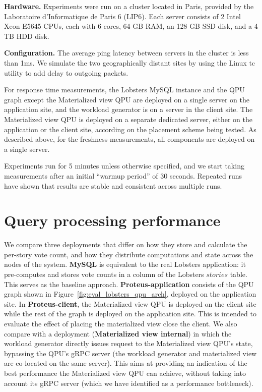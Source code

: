 \bigskip
\noindent
\textbf{Hardware.}
Experiments were run on a cluster located in Paris, provided by the Laboratoire d'Informatique de Paris 6 (LIP6).
Each server consists of 2 Intel Xeon E5645 CPUs, each with 6 cores, 64 GB RAM, an 128 GB SSD disk, and a 4 TB HDD disk.

\bigskip
\noindent
\textbf{Configuration.}
The average ping latency between servers in the cluster is less than 1ms.
We simulate the two geographically distant sites by using the Linux tc utility \cite{tc} to add delay to outgoing packets.

For response time measurements, the Lobsters MySQL instance and the QPU graph except the Materialized view QPU are deployed
on a single server on the application site, and the workload generator is on a server in the client site.
The Materialized view QPU is deployed on a separate dedicated server, either on the application or the client site,
according on the placement scheme being tested.
As described above, for the freshness measurements, all components are deployed on a single server.

Experiments run for 5 minutes unless otherwise specified, and we start taking measurements after an initial
``warmup period'' of 30 seconds.
Repeated runs have shown that results are stable and consistent across multiple runs.


\section{Query processing performance}
\label{sec:eval_query_processing_perf}
We compare three deployments that differ on how they store and calculate the per-story vote count,
and how they distribute computations and state across the nodes of the system.
\textbf{MySQL} is equivalent to the real Lobsters application:
it pre-computes and stores vote counts in a column of the Lobsters $stories$ table.
This serves as the baseline approach.
\textbf{Proteus-application} consists of the QPU graph shown in Figure~\ref{fig:eval_lobsters_qpu_arch},
deployed on the application site.
In \textbf{Proteus-client}, the Materialized view QPU is deployed on the client site while the rest of the graph
is deployed on the application site.
This is intended to evaluate the effect of placing the materialized view close the client.
We also compare with a deployment (\textbf{Materialized view internal}) in which the workload generator
directly issues request to the Materialized view QPU's state, bypassing the QPU's gRPC server
(the workload generator and materialized view are co-located on the same server).
This aims at providing an indication of the best performance the Materialized view QPU can achieve,
without taking into account its gRPC server (which we have identified as a performance bottleneck).

